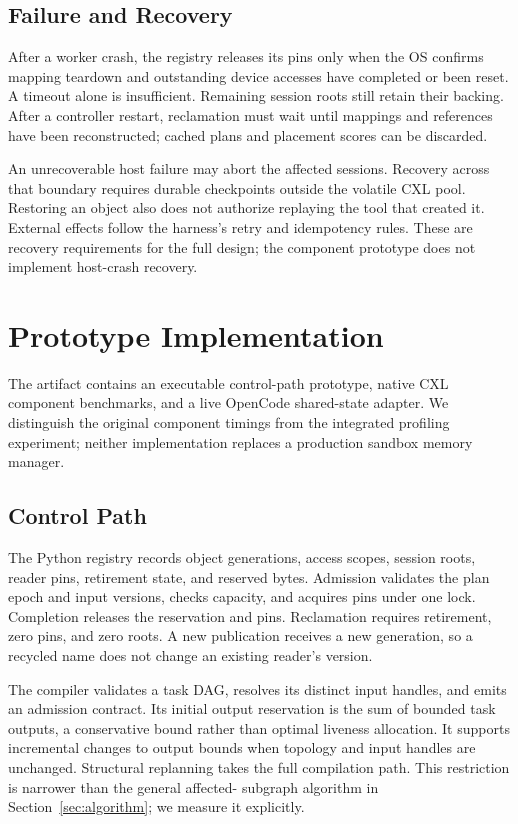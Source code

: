 \documentclass[letterpaper,twocolumn,10pt]{article}
\begin{document}
\subsection{Failure and Recovery}

After a worker crash, the registry releases its pins only when the OS confirms
mapping teardown and outstanding device accesses have completed or been
reset. A timeout alone is insufficient. Remaining session roots still retain
their backing. After a controller restart, reclamation must wait until
mappings and references have been reconstructed; cached plans and placement
scores can be discarded.

An unrecoverable host failure may abort the affected sessions. Recovery
across that boundary requires durable checkpoints outside the volatile CXL
pool. Restoring an object also does not authorize replaying the tool that
created it. External effects follow the harness's retry and idempotency
rules. These are recovery requirements for the full design; the component
prototype does not implement host-crash recovery.

\section{Prototype Implementation}
\label{sec:implementation}

The artifact contains an executable control-path prototype, native CXL
component benchmarks, and a live OpenCode shared-state adapter. We distinguish
the original component timings from the integrated profiling experiment;
neither implementation replaces a production sandbox memory manager.

\subsection{Control Path}

The Python registry records object generations, access scopes, session roots,
reader pins, retirement state, and reserved bytes. Admission validates the
plan epoch and input versions, checks capacity, and acquires pins under one
lock. Completion releases the reservation and pins. Reclamation requires
retirement, zero pins, and zero roots. A new publication receives a new
generation, so a recycled name does not change an existing reader's version.

The compiler validates a task DAG, resolves its distinct input handles, and
emits an admission contract. Its initial output reservation is the sum of
bounded task outputs, a conservative bound rather than optimal liveness
allocation. It supports incremental changes to output bounds when topology
and input handles are unchanged. Structural replanning takes the full
compilation path. This restriction is narrower than the general affected-
subgraph algorithm in Section~\ref{sec:algorithm}; we measure it explicitly.
\end{document}
